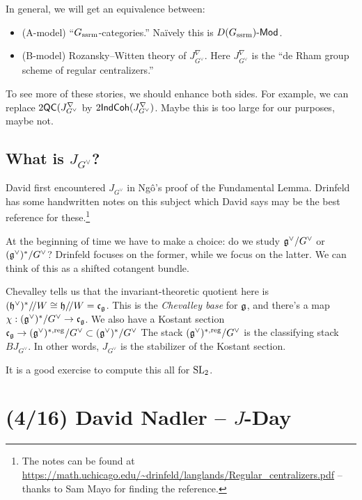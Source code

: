 \documentclass{article}
\begin{document}
In general, we will get an equivalence between:
\begin{itemize}
  \item (A-model) ``$G_{\mathrm{ssrm}}$-categories.''
    Na\"ively this is $D(G_{\mathrm{ssrm}})\text{-}\mathsf{Mod}$.
  \item (B-model) Rozansky--Witten theory of $J_{G^\vee}^\nabla$.
    Here $J_{G^\vee}^\nabla$ is the ``de Rham group scheme of regular centralizers.''
\end{itemize}

\begin{rmk}
  To see more of these stories, we should enhance both sides.
  For example, we can replace $2\mathsf{QC}(J_{G^\vee}^\nabla$ by $2\mathsf{IndCoh}(J_{G^\vee}^\nabla)$.
  Maybe this is too large for our purposes, maybe not.
\end{rmk}

\subsection{What is $J_{G^\vee}$?}

David first encountered $J_{G^\vee}$ in Ng\^o's proof of the Fundamental Lemma.
Drinfeld has some handwritten notes on this subject which David says may be the best reference for these.\footnote{The notes can be found at \url{https://math.uchicago.edu/~drinfeld/langlands/Regular_centralizers.pdf} -- thanks to Sam Mayo for finding the reference.}

At the beginning of time we have to make a choice: do we study $\mathfrak{g}^\vee / G^\vee$ or $(\mathfrak{g}^\vee)^* / G^\vee$?
Drinfeld focuses on the former, while we focus on the latter.
We can think of this as a shifted cotangent bundle.

Chevalley tells us that the invariant-theoretic quotient here is $(\mathfrak{h}^\vee)^* /\mkern-3mu/ W \cong \mathfrak{h} /\mkern-3mu/ W = \mathfrak{c}_{\mathfrak{g}}$.
This is the \emph{Chevalley base} for $\mathfrak{g}$, and there's a map $\chi: (\mathfrak{g}^\vee)^* / G^\vee \to \mathfrak{c}_{\mathfrak{g}}$.
We also have a Kostant section $\mathfrak{c}_{\mathfrak{g}} \to (\mathfrak{g}^\vee)^{*,\textrm{reg}} / G^\vee \subset (\mathfrak{g}^\vee)^* / G^\vee$
The stack $(\mathfrak{g}^\vee)^{*,\textrm{reg}} / G^\vee$ is the classifying stack $BJ_{G^\vee}$.
In other words, $J_{G^\vee}$ is the stabilizer of the Kostant section.

It is a good exercise to compute this all for $\operatorname{SL}_2$.

\section{(4/16) David Nadler -- $J$-Day}
\end{document}
